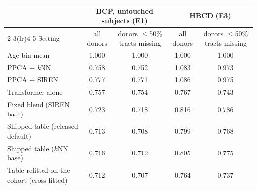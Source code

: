 \begin{tabular}{lcccc}
\toprule
 & \multicolumn{2}{c}{BCP, untouched subjects (E1)} & \multicolumn{2}{c}{HBCD (E3)} \\
\cmidrule(lr){2-3}\cmidrule(lr){4-5}
Setting & all donors & donors $\leq$50\% tracts missing & all donors & donors $\leq$50\% tracts missing \\
\midrule
Age-bin mean & 1.000 & 1.000 & 1.000 & 1.000 \\
PPCA + $k$NN & 0.758 & 0.752 & 1.083 & 0.973 \\
PPCA + SIREN & 0.777 & 0.771 & 1.086 & 0.975 \\
Transformer alone & 0.757 & 0.754 & 0.767 & 0.743 \\
Fixed blend (SIREN base) & 0.723 & 0.718 & 0.816 & 0.786 \\
Shipped table (released default) & 0.713 & 0.708 & 0.799 & 0.768 \\
Shipped table ($k$NN base) & 0.716 & 0.712 & 0.805 & 0.775 \\
Table refitted on the cohort (cross-fitted) & 0.712 & 0.707 & 0.764 & 0.737 \\
\bottomrule
\end{tabular}
